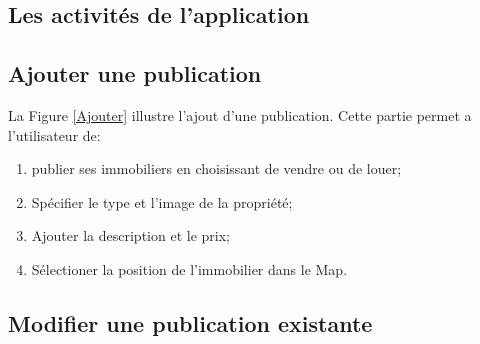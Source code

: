 \documentclass[french,a4,12pt]{report}
\begin{document}
	\newpage
\begin{tcolorbox}[leftrule=3mm]
	\section{Les activités de l'application}
\end{tcolorbox}
\begin{tcolorbox}[colframe=green!75,rightrule=0.5cm,leftrule=0.5cm,]
	\centering
\subsection{Ajouter une publication }
\end{tcolorbox}

La Figure \ref{Ajouter} illustre l'ajout d'une publication. Cette partie permet a l'utilisateur de:
\begin{enumerate}

\item publier ses immobiliers en  choisissant de vendre ou de louer;
\item Spécifier le type et l'image de la propriété;
\item Ajouter la description et le prix;
\item Sélectioner la position de l'immobilier dans le Map.

\end{enumerate}   
%
\newpage
\begin{tcolorbox}[colframe=green!75,rightrule=0.5cm,leftrule=0.5cm,]
	\centering
\subsection{Modifier une publication existante}
\end{tcolorbox}
\end{document}
